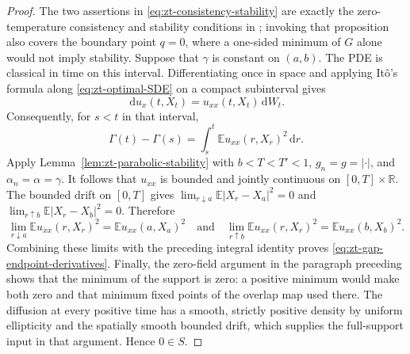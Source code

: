 \documentclass[10pt]{amsart}
\theoremstyle{definition}
\theoremstyle{remark}
\numberwithin{equation}{section}
\newcommand{\R}{\mathbb R}
\newcommand{\E}{\mathbb E}
\newcommand{\1}{\mathbf 1}
\newcommand{\dd}{\,\mathrm d}
\begin{document}
\begin{proof}
The two assertions in \eqref{eq:zt-consistency-stability} are exactly the zero-temperature consistency and stability conditions in \cite[Proposition 3]{ChenHandschyLerman}; invoking that proposition also covers the boundary point $q=0$, where a one-sided minimum of $G$ alone would not imply stability. Suppose that $\gamma$ is constant on $(a,b)$. The PDE is classical in time on this interval. Differentiating once in space and applying It\^o's formula along \eqref{eq:zt-optimal-SDE} on a compact subinterval gives
\begin{equation*}
  \dd u_x(t,X_t)=u_{xx}(t,X_t)\dd W_t.
\end{equation*}
Consequently, for $s<t$ in that interval,
\begin{equation*}
 \Gamma(t)-\Gamma(s)
 =\int_s^t\E u_{xx}(r,X_r)^2\dd r.
\end{equation*}
Apply Lemma~\ref{lem:zt-parabolic-stability} with $b<T<T'<1$, $g_n=g=|\cdot|$, and $\alpha_n=\alpha=\gamma$. It follows that $u_{xx}$ is bounded and jointly continuous on $[0,T]\times\R$. The bounded drift on $[0,T]$ gives $\lim_{r\downarrow a}\E|X_r-X_a|^2=0$ and $\lim_{r\uparrow b}\E|X_r-X_b|^2=0$. Therefore
\begin{equation*}
 \lim_{r\downarrow a}\E u_{xx}(r,X_r)^2=\E u_{xx}(a,X_a)^2
 \quad\text{and}\quad
 \lim_{r\uparrow b}\E u_{xx}(r,X_r)^2=\E u_{xx}(b,X_b)^2.
\end{equation*}
Combining these limits with the preceding integral identity proves \eqref{eq:zt-gap-endpoint-derivatives}. Finally, the zero-field argument in the paragraph preceding \cite[Proposition 5]{ChenHandschyLerman} shows that the minimum of the support is zero: a positive minimum would make both zero and that minimum fixed points of the overlap map used there. The diffusion at every positive time has a smooth, strictly positive density by uniform ellipticity and the spatially smooth bounded drift, which supplies the full-support input in that argument. Hence $0\in S$.
\end{proof}
\end{document}
